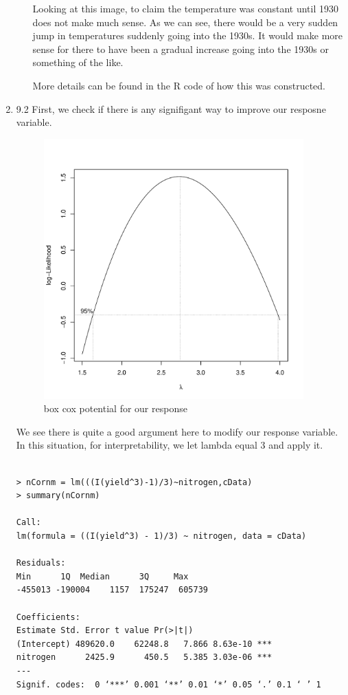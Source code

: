 \documentclass[11pt]{article}
\begin{document}
\begin{enumerate}
\begin{enumerate}
	Looking at this image, to claim the temperature was constant until 1930 does not make much sense. As we can see, there would be a very sudden jump in temperatures suddenly going into the 1930s. It would make more sense for there to have been a gradual increase going into the 1930s or something of the like.
	
	More details can be found in the R code of how this was constructed.
\end{enumerate}
\item 9.2
First, we check if there is any signifigant way to improve our resposne variable.
	\begin{figure}[H]
		\centering
		\includegraphics[width=10cm,height=10cm]{bxcx}
		\caption[corn]{box cox potential for our response}
		\label{corndata}
	\end{figure}
We see there is quite a good argument here to modify our response variable. In this situation, for interpretability, we let lambda equal 3 and apply it.
\begin{verbatim}

> nCornm = lm(((I(yield^3)-1)/3)~nitrogen,cData)
> summary(nCornm)

Call:
lm(formula = ((I(yield^3) - 1)/3) ~ nitrogen, data = cData)

Residuals:
Min      1Q  Median      3Q     Max 
-455013 -190004    1157  175247  605739 

Coefficients:
Estimate Std. Error t value Pr(>|t|)    
(Intercept) 489620.0    62248.8   7.866 8.63e-10 ***
nitrogen      2425.9      450.5   5.385 3.03e-06 ***
---
Signif. codes:  0 ‘***’ 0.001 ‘**’ 0.01 ‘*’ 0.05 ‘.’ 0.1 ‘ ’ 1


\end{verbatim}
\end{enumerate}
\end{document}
